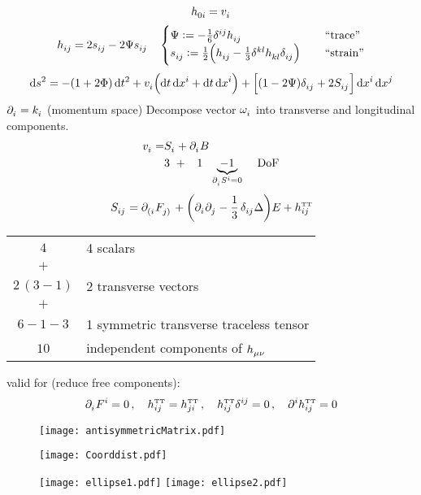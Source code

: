 \begin{equation}
	\tensor{h}{_{0i}} = \tensor{v}{_i}
\end{equation}
\begin{equation}
	\tensor{h}{_{ij}} = 2\tensor{s}{_{ij}} - 2\Psi\tensor{s}{_{ij}}\,\quad
	\begin{cases}
		\Psi := -\frac{1}{6}\tensor{\delta}{^{ij}}\tensor{h}{_{ij}}\,\quad
		&\text{``trace''} \\
		\tensor{s}{_{ij}} := \frac{1}{2} \left(\tensor{h}{_{ij}} - \frac{1}{3}\tensor{\delta}{^{kl}}\tensor{h}{_{kl}}\tensor{\delta}{_{ij}}\right)\,\quad &\text{``strain''}
	\end{cases}
\end{equation}
\begin{equation}
	\dif s^2 = -\left(1+2\Phi\right)\dif t^2 + \tensor{v}{_i} \left(\dif t \dif \tensor{x}{^i} + \dif t \dif \tensor{x}{^i}\right) + \left[\left(1-2\Psi\right)\tensor{\delta}{_{ij}} + 2 \tensor{S}{_{ij}} \right]\dif \tensor{x}{^i}\dif \tensor{x}{^j}
\end{equation}
$\tensor{\partial}{_i} = \tensor{k}{_i}$ (momentum space)
Decompose vector $\tensor{\omega}{_i}$ into transverse and longitudinal components.
\begin{align}
	\tensor{v}{_i} = &\tensor{S}{_i} + \tensor{\partial}{_i}B\\
	&3\,\,+\,\,\,\,\,1\,\,\,\,\underbrace{-1}_{\tensor{\partial}{_i}\tensor{S}{^i}=0}\,\quad \text{DoF}
\end{align}
\begin{equation}
	\tensor{S}{_{ij}} = \tensor{\partial}{_{(i}}\tensor{F}{_{j)}} + \left( \tensor{\partial}{_i}\tensor{\partial}{_j} - \frac{1}{3}\,\tensor{\delta}{_{ij}}\Delta\right) E + \tensor*{h}{_{ij}^{\text{\tiny TT}}}
\end{equation}
\begin{center}
\begin{tabular}{c l}
$4$ & 4 scalars \\
$+$ & \\
$2\,(3-1)$ & 2 transverse vectors \\
$+$ & \\
$6-1-3$ & 1 symmetric transverse traceless tensor \\
\midrule
$10$ & independent components of $\tensor{h}{_{\mu\nu}}$
\end{tabular}
\end{center}
valid for (reduce free components):
\begin{equation}
\tensor{\partial}{_i}\tensor{F}{^i}=0\,,\quad\tensor*{h}{_{ij}^{\text{\tiny TT}}}=\tensor*{h}{_{ji}^{\text{\tiny TT}}}\,,\quad\tensor*{h}{_{ij}^{\text{\tiny TT}}}\tensor{\delta}{^{ij}}=0\,,\quad\tensor{\partial}{^i}\tensor*{h}{_{ij}^{\text{\tiny TT}}}=0
\end{equation}
\begin{figure}[hbtp!]
\centering
 \texttt{[image: antisymmetricMatrix.pdf]}
\caption{}
\end{figure}
\begin{figure}[hbtp!]
\centering
 \texttt{[image: Coorddist.pdf]}
\caption{}
\end{figure}

\begin{figure}[hbtp!]
\centering
 \texttt{[image: ellipse1.pdf]}
 \texttt{[image: ellipse2.pdf]}
\caption{}
\end{figure}

